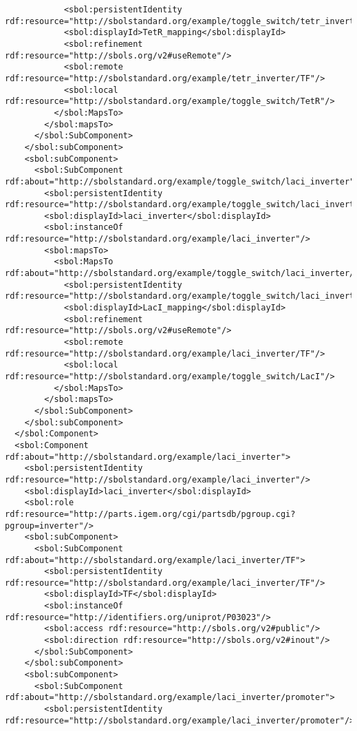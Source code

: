 \begin{lstlisting}
            <sbol:persistentIdentity rdf:resource="http://sbolstandard.org/example/toggle_switch/tetr_inverter/TetR_mapping"/>
            <sbol:displayId>TetR_mapping</sbol:displayId>
            <sbol:refinement rdf:resource="http://sbols.org/v2#useRemote"/>
            <sbol:remote rdf:resource="http://sbolstandard.org/example/tetr_inverter/TF"/>
            <sbol:local rdf:resource="http://sbolstandard.org/example/toggle_switch/TetR"/>
          </sbol:MapsTo>
        </sbol:mapsTo>
      </sbol:SubComponent>
    </sbol:subComponent>
    <sbol:subComponent>
      <sbol:SubComponent rdf:about="http://sbolstandard.org/example/toggle_switch/laci_inverter">
        <sbol:persistentIdentity rdf:resource="http://sbolstandard.org/example/toggle_switch/laci_inverter"/>
        <sbol:displayId>laci_inverter</sbol:displayId>
        <sbol:instanceOf rdf:resource="http://sbolstandard.org/example/laci_inverter"/>
        <sbol:mapsTo>
          <sbol:MapsTo rdf:about="http://sbolstandard.org/example/toggle_switch/laci_inverter/LacI_mapping">
            <sbol:persistentIdentity rdf:resource="http://sbolstandard.org/example/toggle_switch/laci_inverter/LacI_mapping"/>
            <sbol:displayId>LacI_mapping</sbol:displayId>
            <sbol:refinement rdf:resource="http://sbols.org/v2#useRemote"/>
            <sbol:remote rdf:resource="http://sbolstandard.org/example/laci_inverter/TF"/>
            <sbol:local rdf:resource="http://sbolstandard.org/example/toggle_switch/LacI"/>
          </sbol:MapsTo>
        </sbol:mapsTo>
      </sbol:SubComponent>
    </sbol:subComponent>
  </sbol:Component>
  <sbol:Component rdf:about="http://sbolstandard.org/example/laci_inverter">
    <sbol:persistentIdentity rdf:resource="http://sbolstandard.org/example/laci_inverter"/>
    <sbol:displayId>laci_inverter</sbol:displayId>
    <sbol:role rdf:resource="http://parts.igem.org/cgi/partsdb/pgroup.cgi?pgroup=inverter"/>
    <sbol:subComponent>
      <sbol:SubComponent rdf:about="http://sbolstandard.org/example/laci_inverter/TF">
        <sbol:persistentIdentity rdf:resource="http://sbolstandard.org/example/laci_inverter/TF"/>
        <sbol:displayId>TF</sbol:displayId>
        <sbol:instanceOf rdf:resource="http://identifiers.org/uniprot/P03023"/>
        <sbol:access rdf:resource="http://sbols.org/v2#public"/>
        <sbol:direction rdf:resource="http://sbols.org/v2#inout"/>
      </sbol:SubComponent>
    </sbol:subComponent>
    <sbol:subComponent>
      <sbol:SubComponent rdf:about="http://sbolstandard.org/example/laci_inverter/promoter">
        <sbol:persistentIdentity rdf:resource="http://sbolstandard.org/example/laci_inverter/promoter"/>

\end{lstlisting}
